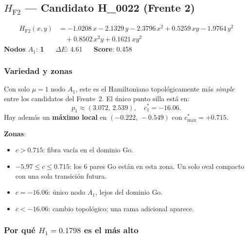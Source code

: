 \documentclass[11pt,a4paper]{article}
\newcommand{\dE}{\Delta E}
\begin{document}
\subsection{\texorpdfstring{$H_{\text{F2}}$}{H\_F2} --- Candidato H\_0022 (Frente 2)}

\begin{tcolorbox}[hambox,title={$H_{\text{F2}}$ (H\_0022, \textcolor{cFront2}{Frente 2}) $\cdot$
  $H_1$-max = 0.1798 $\cdot$ Rob = 1.000 $\cdot$ \textbf{Mayor $H_1$ del grupo}}]
\begin{align*}
  H_{\text{F2}}(x,y) &=
    -1.0208\,x - 2.1329\,y
    - 2.3796\,x^2 + 0.5259\,xy - 1.9764\,y^2 \\
  &\quad + 0.8502\,x^2y + 0.1621\,xy^2
\end{align*}
\textbf{Nodos $A_1$}: \textbf{1} $\quad$
\textbf{$\dE$}: 4.61 $\quad$
\textbf{Score}: 0.458
\end{tcolorbox}

\subsubsection*{Variedad y zonas}

Con solo $\mu=1$ nodo $A_1$, este es el Hamiltoniano topológicamente más
\emph{simple} entre los candidatos del Frente~2. El único punto silla está en:
\[
  p_1\approx(3.072,\,2.539),\quad c^*_1=-16.06.
\]
Hay además un \textbf{máximo local} en $(-0.222,\,-0.549)$ con
$c^*_{\max}=+0.715$.

\textbf{Zonas}:
\begin{itemize}[noitemsep]
  \item $c > 0.715$: fibra vacía en el dominio Go.
  \item $-5.97 \leq c \leq 0.715$: los 6 pares Go están en esta zona.
        Un solo oval compacto con una sola transición futura.
  \item $c = -16.06$: único nodo $A_1$, lejos del dominio Go.
  \item $c < -16.06$: cambio topológico; una rama adicional aparece.
\end{itemize}

\subsubsection*{Por qué $H_1=0.1798$ es el más alto}
\end{document}
